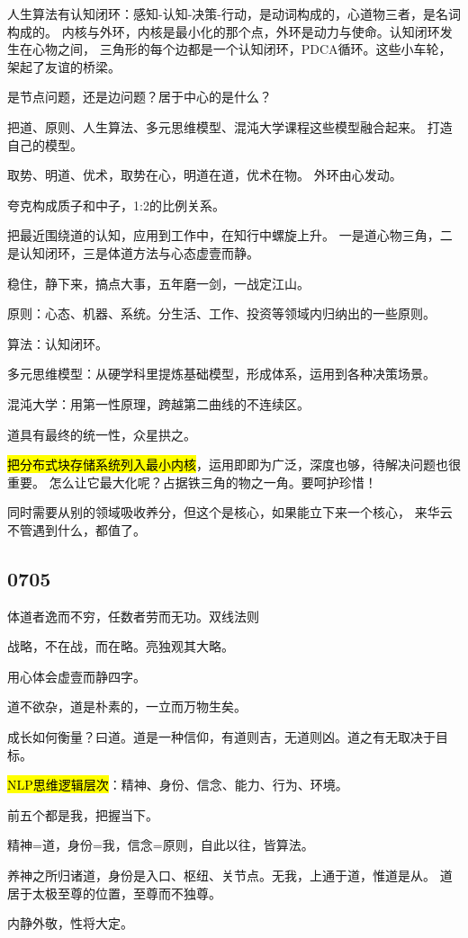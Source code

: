 人生算法有认知闭环：感知-认知-决策-行动，是动词构成的，心道物三者，是名词构成的。
内核与外环，内核是最小化的那个点，外环是动力与使命。认知闭环发生在心物之间，
三角形的每个边都是一个认知闭环，PDCA循环。这些小车轮，架起了友谊的桥梁。

是节点问题，还是边问题？居于中心的是什么？

把道、原则、人生算法、多元思维模型、混沌大学课程这些模型融合起来。
打造自己的模型。

取势、明道、优术，取势在心，明道在道，优术在物。
外环由心发动。

夸克构成质子和中子，1:2的比例关系。

把最近围绕道的认知，应用到工作中，在知行中螺旋上升。
一是道心物三角，二是认知闭环，三是体道方法与心态虚壹而静。

稳住，静下来，搞点大事，五年磨一剑，一战定江山。

原则：心态、机器、系统。分生活、工作、投资等领域内归纳出的一些原则。

算法：认知闭环。

多元思维模型：从硬学科里提炼基础模型，形成体系，运用到各种决策场景。

混沌大学：用第一性原理，跨越第二曲线的不连续区。

道具有最终的统一性，众星拱之。

\hl{把分布式块存储系统列入最小内核}，运用即即为广泛，深度也够，待解决问题也很重要。
怎么让它最大化呢？占据铁三角的物之一角。要呵护珍惜！

同时需要从别的领域吸收养分，但这个是核心，如果能立下来一个核心，
来华云不管遇到什么，都值了。

\subsection{0705}

体道者逸而不穷，任数者劳而无功。双线法则

战略，不在战，而在略。亮独观其大略。

用心体会虚壹而静四字。

道不欲杂，道是朴素的，一立而万物生矣。


成长如何衡量？曰道。道是一种信仰，有道则吉，无道则凶。道之有无取决于目标。

\hl{NLP思维逻辑层次}：精神、身份、信念、能力、行为、环境。

前五个都是我，把握当下。

精神=道，身份=我，信念=原则，自此以往，皆算法。

养神之所归诸道，身份是入口、枢纽、关节点。无我，上通于道，惟道是从。
道居于太极至尊的位置，至尊而不独尊。

内静外敬，性将大定。
